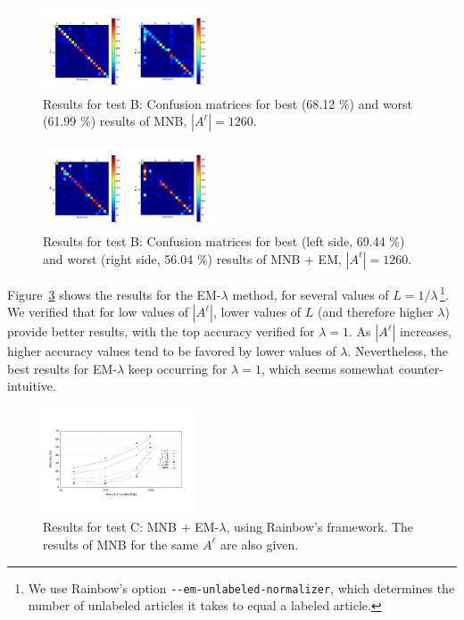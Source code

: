 \begin{figure}[h!]

    \centering
    \includegraphics[width=0.45\textwidth]{figures/mnb-conf-1260.png}
    \cprotect\caption{Results for test B: Confusion matrices for best (68.12 \%) 
        and worst (61.99 \%) results of 
        MNB, $|A^\ell| = 1260$.}
    \label{fig:mnb-em-mnb}

\end{figure}

\begin{figure}[h!]

    \centering
    \includegraphics[width=0.45\textwidth]{figures/em-conf-1260.png}
    \cprotect\caption{Results for test B: Confusion matrices for best (left side, 69.44 \%) 
        and worst (right side, 56.04 \%) results of 
        MNB + EM, $|A^\ell| = 1260$.}
    \label{fig:mnb-em-em}

\end{figure}

Figure~\ref{fig:mnb-em-lambda} shows the results for the EM-$\lambda$ method, 
for several values of $L = 1 / \lambda$\,\cprotect\footnote{We use Rainbow's option 
\verb+--em-unlabeled-normalizer+, which determines the number of unlabeled 
articles it takes to equal a labeled article.}. We verified that for low values 
of $|A^\ell|$, lower values of $L$ (and therefore higher $\lambda$) provide 
better results, with the top accuracy verified for $\lambda = 1$. As $|A^\ell|$ 
increases, higher accuracy values tend to be favored by lower values of $\lambda$. 
Nevertheless, the best results for EM-$\lambda$ keep occurring for $\lambda = 1$, 
which seems somewhat counter-intuitive.

\begin{figure}[h!]

    \centering
    \includegraphics[width=0.40\textwidth]{figures/em-lambda.pdf}
    \cprotect\caption{Results for test C: MNB + EM-$\lambda$, using Rainbow's framework. 
        The results of MNB for the same $A^\ell$ are also given.}
    \label{fig:mnb-em-lambda}

\end{figure}
